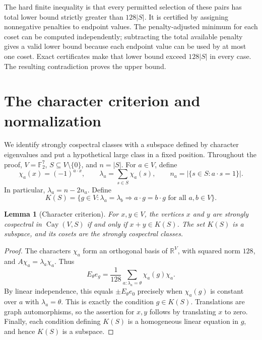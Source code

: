 \documentclass[11pt]{article}
\newtheorem{lemma}[theorem]{Lemma}
\theoremstyle{definition}
\newcommand{\F}{\mathbb F}
\newcommand{\R}{\mathbb R}
\newcommand{\Cay}{\operatorname{Cay}}
\begin{document}
The hard finite inequality is that every permitted selection of these
pairs has total lower bound strictly greater than $128|S|$.
It is certified by assigning nonnegative penalties to endpoint values.
The penalty-adjusted minimum for each coset can be computed independently;
subtracting the total available penalty gives a valid lower bound because
each endpoint value can be used by at most one coset.
Exact certificates make that lower bound exceed $128|S|$ in every case.
The resulting contradiction proves the upper bound.

\section{The character criterion and normalization}\label{sec:characters}
We identify strongly cospectral classes with a subspace defined by
character eigenvalues and put a hypothetical large class in a fixed position.
Throughout the proof, $V=\F_2^7$, $S\subseteq V\setminus\{0\}$, and
$n=|S|$. For $a\in V$, define
\begin{equation}\label{eq:lambda}
 \chi_a(x)=(-1)^{a\cdot x},\qquad
 \lambda_a=\sum_{s\in S}\chi_a(s),\qquad
 n_a=|\{s\in S:a\cdot s=1\}|.
\end{equation}
In particular, $\lambda_a=n-2n_a$. Define
\begin{equation}\label{eq:K}
 K(S)=\{g\in V:\lambda_a=\lambda_b\Longrightarrow
                  a\cdot g=b\cdot g\text{ for all }a,b\in V\}.
\end{equation}

\begin{lemma}[Character criterion]\label{lem:criterion}
For $x,y\in V$, the vertices $x$ and $y$ are strongly cospectral in
$\Cay(V,S)$ if and only if $x+y\in K(S)$.
The set $K(S)$ is a subspace, and its cosets are the strongly cospectral
classes.
\end{lemma}
\begin{proof}
The characters $\chi_a$ form an orthogonal basis of $\R^V$, with squared
norm $128$, and $A\chi_a=\lambda_a\chi_a$. Thus
\[
 E_\theta e_g=\frac1{128}
          \sum_{a:\lambda_a=\theta}\chi_a(g)\chi_a.
\]
By linear independence, this equals $\pm E_\theta e_0$ precisely when
$\chi_a(g)$ is constant over $a$ with $\lambda_a=\theta$.
This is exactly the condition $g\in K(S)$.
Translations are graph automorphisms, so the assertion for $x,y$ follows
by translating $x$ to zero. Finally, each condition defining $K(S)$ is
a homogeneous linear equation in $g$, and hence $K(S)$ is a subspace.
\end{proof}
\end{document}
